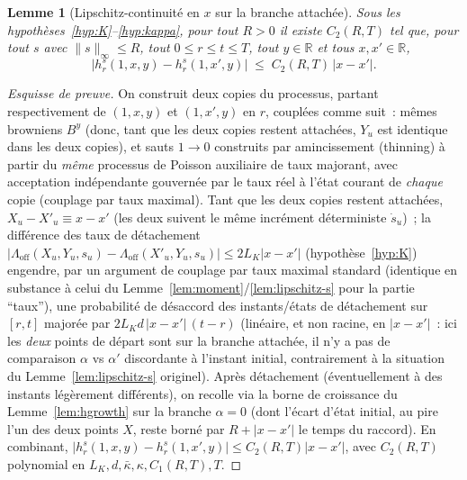 \documentclass[11pt,a4paper]{article}
\newcommand{\R}{\mathbb{R}}
\newcommand{\Loff}{\Lambda_{\mathrm{off}}}
\theoremstyle{plain}
\newtheorem{lem}[thm]{Lemme}
\theoremstyle{definition}
\begin{document}
\begin{lem}[Lipschitz-continuit\'e en $x$ sur la branche attach\'ee]
\label{lem:hxlip}
Sous les hypoth\`eses~\ref{hyp:K}--\ref{hyp:kappa}, pour tout $R>0$ il existe $C_2(R,T)$ tel que, pour tout $s$ avec $\|s\|_\infty\le R$, tout $0\le r\le t\le T$, tout $y\in\R$ et tous $x,x'\in\R$,
\[
\big|h^s_r(1,x,y)-h^s_r(1,x',y)\big| \;\le\; C_2(R,T)\,|x-x'|.
\]
\end{lem}
\begin{proof}[Esquisse de preuve]
On construit deux copies du processus, partant respectivement de $(1,x,y)$ et $(1,x',y)$ en $r$, coupl\'ees comme suit~: m\^emes browniens $B^y$ (donc, tant que les deux copies restent attach\'ees, $Y_u$ est identique dans les deux copies), et sauts $1\to0$ construits par amincissement (thinning) \`a partir du \emph{m\^eme} processus de Poisson auxiliaire de taux majorant, avec acceptation ind\'ependante gouvern\'ee par le taux r\'eel \`a l'\'etat courant de \emph{chaque} copie (couplage par taux maximal). Tant que les deux copies restent attach\'ees, $X_u-X'_u\equiv x-x'$ (les deux suivent le m\^eme incr\'ement d\'eterministe $\dot s_u$)~; la diff\'erence des taux de d\'etachement $\big|\Loff(X_u,Y_u,s_u)-\Loff(X'_u,Y_u,s_u)\big|\le 2L_K|x-x'|$ (hypoth\`ese~\ref{hyp:K}) engendre, par un argument de couplage par taux maximal standard (identique en substance \`a celui du Lemme~\ref{lem:moment}/\ref{lem:lipschitz-s} pour la partie ``taux''), une probabilit\'e de d\'esaccord des instants/\'etats de d\'etachement sur $[r,t]$ major\'ee par $2L_Kd\,|x-x'|\,(t-r)$ (lin\'eaire, et non racine, en $|x-x'|$~: ici les \emph{deux} points de d\'epart sont sur la branche attach\'ee, il n'y a pas de comparaison $\alpha$ vs $\alpha'$ discordante \`a l'instant initial, contrairement \`a la situation du Lemme~\ref{lem:lipschitz-s} originel). Apr\`es d\'etachement (\'eventuellement \`a des instants l\'eg\`erement diff\'erents), on recolle via la borne de croissance du Lemme~\ref{lem:hgrowth} sur la branche $\alpha=0$ (dont l'\'ecart d'\'etat initial, au pire l'un des deux points $X$, reste born\'e par $R+|x-x'|$ le temps du raccord). En combinant, $\big|h^s_r(1,x,y)-h^s_r(1,x',y)\big|\le C_2(R,T)|x-x'|$, avec $C_2(R,T)$ polynomial en $L_K,d,\bar\kappa,\kappa,C_1(R,T),T$.
\end{proof}
\end{document}
